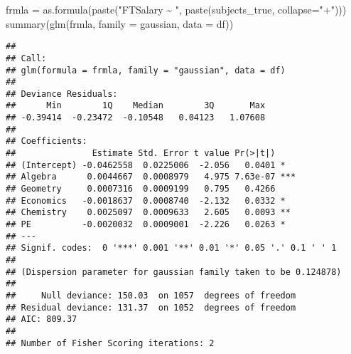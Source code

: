 \documentclass[
]{article}
\newenvironment{Shaded}{\begin{snugshade}}{\end{snugshade}}
\newcommand{\AttributeTok}[1]{\textcolor[rgb]{0.77,0.63,0.00}{#1}}
\newcommand{\FunctionTok}[1]{\textcolor[rgb]{0.00,0.00,0.00}{#1}}
\newcommand{\NormalTok}[1]{#1}
\newcommand{\OtherTok}[1]{\textcolor[rgb]{0.56,0.35,0.01}{#1}}
\newcommand{\StringTok}[1]{\textcolor[rgb]{0.31,0.60,0.02}{#1}}
\begin{document}
\begin{Shaded}
\begin{Highlighting}[]
\NormalTok{frmla }\OtherTok{=} \FunctionTok{as.formula}\NormalTok{(}\FunctionTok{paste}\NormalTok{(}\StringTok{"FTSalary \textasciitilde{} "}\NormalTok{, }\FunctionTok{paste}\NormalTok{(subjects\_true, }\AttributeTok{collapse=}\StringTok{"+"}\NormalTok{))) }
\FunctionTok{summary}\NormalTok{(}\FunctionTok{glm}\NormalTok{(frmla, }\AttributeTok{family =} \StringTok{\textquotesingle{}gaussian\textquotesingle{}}\NormalTok{, }\AttributeTok{data =}\NormalTok{ df))}
\end{Highlighting}
\end{Shaded}

\begin{verbatim}
## 
## Call:
## glm(formula = frmla, family = "gaussian", data = df)
## 
## Deviance Residuals: 
##      Min        1Q    Median        3Q       Max  
## -0.39414  -0.23472  -0.10548   0.04123   1.07608  
## 
## Coefficients:
##               Estimate Std. Error t value Pr(>|t|)    
## (Intercept) -0.0462558  0.0225006  -2.056   0.0401 *  
## Algebra      0.0044667  0.0008979   4.975 7.63e-07 ***
## Geometry     0.0007316  0.0009199   0.795   0.4266    
## Economics   -0.0018637  0.0008740  -2.132   0.0332 *  
## Chemistry    0.0025097  0.0009633   2.605   0.0093 ** 
## PE          -0.0020032  0.0009001  -2.226   0.0263 *  
## ---
## Signif. codes:  0 '***' 0.001 '**' 0.01 '*' 0.05 '.' 0.1 ' ' 1
## 
## (Dispersion parameter for gaussian family taken to be 0.124878)
## 
##     Null deviance: 150.03  on 1057  degrees of freedom
## Residual deviance: 131.37  on 1052  degrees of freedom
## AIC: 809.37
## 
## Number of Fisher Scoring iterations: 2
\end{verbatim}

\begin{verbatim}
\end{verbatim}
\end{document}
